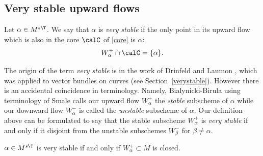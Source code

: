 \subsection{Very stable upward flows}
\begin{definition}
\notready Let $\alpha\in M^{s\T}$. We say that $\alpha$ is {\em very stable} if the only point in its upward flow which is also in the core $\calC$ of \eqref{core} is $\alpha$: $$W^+_\alpha\cap \calC=\{\alpha\}.$$ %
\end{definition}

\begin{remark}
\notready The origin of the term {\em very stable} is in the work of Drinfeld \cite{drinfeld} and  Laumon \cite{laumon}, which was applied to vector bundles on curves (see Section~\ref{verystable}). However there is an accidental coincidence in  terminology. Namely, Bialynicki-Birula \cite{bialynicki-birula2} using terminology of Smale \cite[II.2]{smale} calls our upward flow $W^+_\alpha$ the {\em stable} subscheme of $\alpha$ while our downward flow $W^-_\alpha$ is called the {\em unstable} subscheme of $\alpha$. Our definition above can be formulated to say that the stable subscheme $W^+_\alpha$ is {\em very stable} if and only if it disjoint from the unstable subschemes $W^-_\beta$ for $\beta\neq \alpha$.
\end{remark}
\begin{proposition}
\notready \label{upwardclose} $\alpha\in M^{s\T}$ is very stable if and only if $W^+_\alpha\subset M$ is closed.
\end{proposition}
